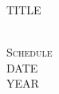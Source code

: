 \documentclass[a4paper]{article}
\begin{document}
\thispagestyle{empty}
\begin{landscape}
\hspace*{\fill}	\hypertarget{talks}{\textsc{\Huge TITLE}} \hspace*{\fill}\\ %

\hspace*{\fill}  \textsc{\LARGE Schedule} \hspace*{\fill}
\\

\hspace*{\fill} \textsc{\LARGE DATE} \hspace*{\fill} %
\\

\hspace*{\fill} {\LARGE YEAR} \hspace*{\fill} %


\end{landscape}
\end{document}
